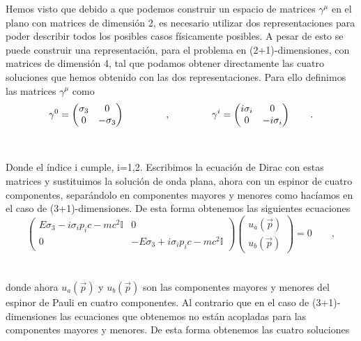\documentclass[11pt,letterpaper]{article}     %
\begin{document}
Hemos visto que debido a que podemos construir un espacio de matrices $\gamma^\mu$ en el plano con matrices de dimensión 2, es necesario utilizar dos representaciones para poder describir todos los posibles casos físicamente posibles. A pesar de esto se puede construir una representación, para el problema en (2+1)-dimensiones, con matrices de dimensión 4, tal que podamos obtener directamente las cuatro soluciones que hemos obtenido con las dos representaciones. Para ello definimos las matrices $\gamma^\mu$ como \\
\begin{equation} \label{eq:128}
\gamma^0 = \begin{pmatrix}
\sigma_3 & 0 \\ 0 & -\sigma_3
\end{pmatrix} \hspace{1.5cm}, \hspace{1.5cm}
\gamma^i = \begin{pmatrix}
i \sigma_i & 0 \\ 0 & -i \sigma_i
\end{pmatrix} \qquad .
\end{equation} \\ \\
Donde el índice i cumple, i=1,2. Escribimos la ecuación de Dirac con estas matrices y sustituimos la solución de onda plana, ahora con un espinor de cuatro componentes, separándolo en componentes mayores y menores como hacíamos en el caso de (3+1)-dimensiones. De esta forma obtenemos las siguientes ecuaciones \\
\begin{equation} \label{eq:129}
\begin{pmatrix}
E \sigma_3 - i\sigma_i p_ic - mc^2 \mathbb{I} &0 \\ 0 & -E \sigma_3 + i \sigma_i p_ic - mc^2 \mathbb{I}
\end{pmatrix}
\begin{pmatrix}
u_a (\vec{p}) \\ u_b(\vec{p}) 
\end{pmatrix}=0 \qquad ,
\end{equation} \\ \\
donde ahora $u_a(\vec{p})$ y $u_b(\vec{p})$ son las componentes mayores y menores del espinor de Pauli en cuatro componentes. Al contrario que en el caso de (3+1)-dimensiones las ecuaciones que obtenemos no están acopladas para las componentes mayores y menores. De esta forma obtenemos las cuatro soluciones \\
\end{document}
